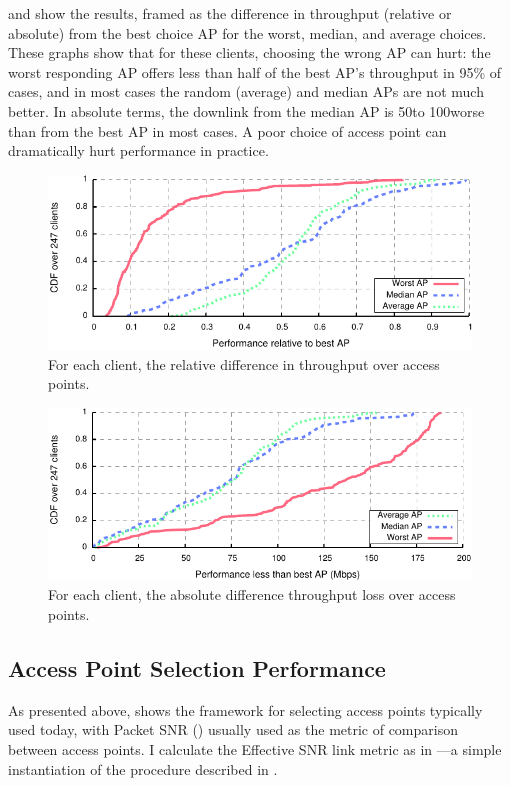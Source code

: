  and  show the results, framed as the difference in throughput (relative or absolute) from the best choice AP for the worst, median, and average choices. These graphs show that for these clients, choosing the wrong AP can hurt: the worst responding AP offers less than half of the best AP's throughput in 95\% of cases, and in most cases the random (average) and median APs are not much better. In absolute terms, the downlink from the median AP is 50\Mbps to 100\Mbps worse than from the best AP in most cases. A poor choice of access point can dramatically hurt performance in practice.

\begin{figure}[t]
	\centering
	\includegraphics[width=\textwidth]{figures/applications/ap_sel_rel_diff.pdf}
	\caption{\label{fig:ap_sel_rel_diff}For each client, the relative difference in throughput over access points.}
\end{figure}

\begin{figure}[t]
	\centering
	\includegraphics[width=\textwidth]{figures/applications/ap_sel_tpt_diff.pdf}
	\caption{\label{fig:ap_sel_tpt_diff}For each client, the absolute difference throughput loss over access points.}
\end{figure}

\subsection{Access Point Selection Performance}
As presented above,  shows the framework for selecting access points typically used today, with Packet SNR () usually used as the metric of comparison between access points. I calculate the Effective SNR link metric as in ---a simple instantiation of the procedure described in . 

